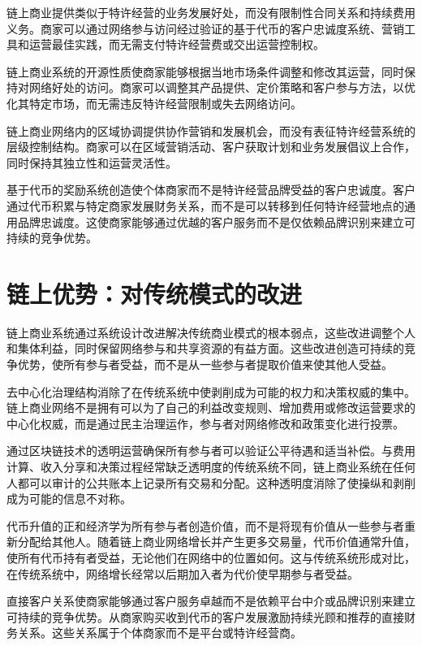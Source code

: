 \documentclass[
  Letterpaper,
]{scrbook}
\begin{document}
链上商业提供类似于特许经营的业务发展好处，而没有限制性合同关系和持续费用义务。商家可以通过网络参与访问经过验证的基于代币的客户忠诚度系统、营销工具和运营最佳实践，而无需支付特许经营费或交出运营控制权。

链上商业系统的开源性质使商家能够根据当地市场条件调整和修改其运营，同时保持对网络好处的访问。商家可以调整其产品提供、定价策略和客户参与方法，以优化其特定市场，而无需违反特许经营限制或失去网络访问。

链上商业网络内的区域协调提供协作营销和发展机会，而没有表征特许经营系统的层级控制结构。商家可以在区域营销活动、客户获取计划和业务发展倡议上合作，同时保持其独立性和运营灵活性。

基于代币的奖励系统创造使个体商家而不是特许经营品牌受益的客户忠诚度。客户通过代币积累与特定商家发展财务关系，而不是可以转移到任何特许经营地点的通用品牌忠诚度。这使商家能够通过优越的客户服务而不是仅依赖品牌识别来建立可持续的竞争优势。

\section{链上优势：对传统模式的改进}\label{ux94feux4e0aux4f18ux52bfux5bf9ux4f20ux7edfux6a21ux5f0fux7684ux6539ux8fdb}

链上商业系统通过系统设计改进解决传统商业模式的根本弱点，这些改进调整个人和集体利益，同时保留网络参与和共享资源的有益方面。这些改进创造可持续的竞争优势，使所有参与者受益，而不是从一些参与者提取价值来使其他人受益。

去中心化治理结构消除了在传统系统中使剥削成为可能的权力和决策权威的集中。链上商业网络不是拥有可以为了自己的利益改变规则、增加费用或修改运营要求的中心化权威，而是通过民主治理运作，参与者对网络修改和政策变化进行投票。

通过区块链技术的透明运营确保所有参与者可以验证公平待遇和适当补偿。与费用计算、收入分享和决策过程经常缺乏透明度的传统系统不同，链上商业系统在任何人都可以审计的公共账本上记录所有交易和分配。这种透明度消除了使操纵和剥削成为可能的信息不对称。

代币升值的正和经济学为所有参与者创造价值，而不是将现有价值从一些参与者重新分配给其他人。随着链上商业网络增长并产生更多交易量，代币价值通常升值，使所有代币持有者受益，无论他们在网络中的位置如何。这与传统系统形成对比，在传统系统中，网络增长经常以后期加入者为代价使早期参与者受益。

直接客户关系使商家能够通过客户服务卓越而不是依赖平台中介或品牌识别来建立可持续的竞争优势。从商家购买收到代币的客户发展激励持续光顾和推荐的直接财务关系。这些关系属于个体商家而不是平台或特许经营商。
\end{document}
